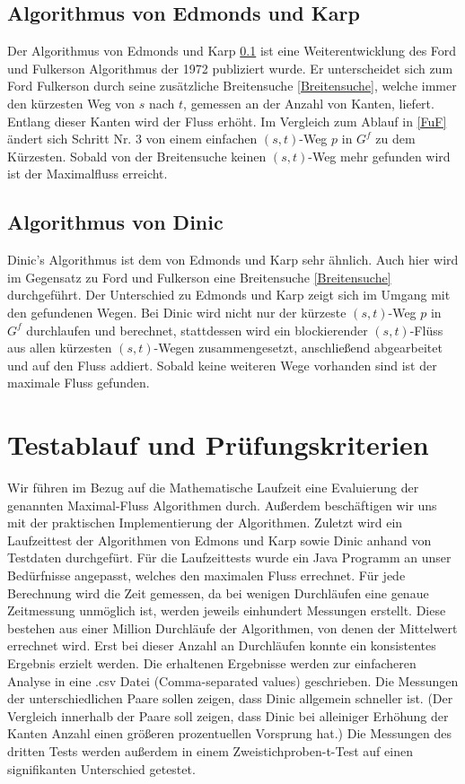 \documentclass[a4paper]{llncs}
\begin{document}
\subsection{Algorithmus von Edmonds und Karp}
\label{EuK}
Der Algorithmus von Edmonds und Karp \ref{EuK} ist eine Weiterentwicklung des Ford und Fulkerson Algorithmus der 1972 publiziert wurde.
Er unterscheidet sich zum Ford Fulkerson durch seine zusätzliche Breitensuche \ref{Breitensuche},
welche immer den kürzesten Weg von $s$ nach $t$, gemessen an der Anzahl von Kanten, liefert. 
Entlang dieser Kanten wird der Fluss erhöht.
Im Vergleich zum Ablauf in \ref{FuF} ändert sich Schritt Nr. 3 von einem einfachen $(s, t)$-Weg $p$ in $G^{f}$ zu dem Kürzesten.
Sobald von der Breitensuche keinen $(s,t)$-Weg mehr gefunden wird ist der Maximalfluss erreicht.

\subsection{Algorithmus von Dinic}
\label{Dinic}
Dinic's Algorithmus ist dem von Edmonds und Karp sehr ähnlich. Auch hier wird im Gegensatz zu Ford und Fulkerson eine Breitensuche \ref{Breitensuche} durchgeführt. Der Unterschied zu Edmonds und Karp zeigt sich im Umgang mit den gefundenen Wegen. Bei Dinic wird nicht nur der kürzeste $(s, t)$-Weg $p$ in $G^{f}$ durchlaufen und berechnet, stattdessen wird ein blockierender $(s, t)$-Flüss aus allen kürzesten $(s, t)$-Wegen zusammengesetzt, anschließend abgearbeitet und auf den Fluss addiert. Sobald keine weiteren Wege vorhanden sind ist der maximale Fluss gefunden.

\section{Testablauf und Prüfungskriterien}
\label{Inhalt}
Wir führen im Bezug auf die Mathematische Laufzeit eine Evaluierung der genannten Maximal-Fluss Algorithmen durch. Außerdem beschäftigen wir uns mit der praktischen Implementierung der Algorithmen. Zuletzt wird ein Laufzeittest der Algorithmen von Edmons und Karp sowie Dinic anhand von Testdaten durchgefürt.
Für die Laufzeittests wurde ein Java Programm an unser Bedürfnisse angepasst, welches den maximalen Fluss errechnet. 
Für jede Berechnung wird die Zeit gemessen, da bei wenigen Durchläufen eine genaue Zeitmessung unmöglich ist, werden jeweils einhundert Messungen erstellt. Diese bestehen aus einer Million Durchläufe der Algorithmen, von denen der Mittelwert errechnet wird.
Erst bei dieser Anzahl an Durchläufen konnte ein konsistentes Ergebnis erzielt werden.
Die erhaltenen Ergebnisse werden zur einfacheren Analyse in eine .csv Datei (Comma-separated values) geschrieben.
Die Messungen der unterschiedlichen Paare sollen zeigen, dass Dinic allgemein schneller ist.
(Der Vergleich innerhalb der Paare soll zeigen, dass Dinic bei alleiniger Erhöhung der Kanten Anzahl einen größeren prozentuellen Vorsprung hat.)
Die Messungen des dritten Tests werden außerdem in einem Zweistichproben-t-Test auf einen signifikanten Unterschied getestet. 
\end{document}
